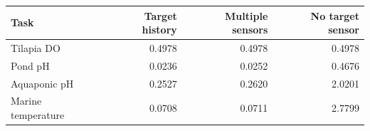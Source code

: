 \begin{tabular}{lrrr}
\toprule
Task & Target history & Multiple sensors & No target sensor \\
\midrule
Tilapia DO & 0.4978 & 0.4978 & 0.4978 \\
Pond pH & 0.0236 & 0.0252 & 0.4676 \\
Aquaponic pH & 0.2527 & 0.2620 & 2.0201 \\
Marine temperature & 0.0708 & 0.0711 & 2.7799 \\
\bottomrule
\end{tabular}